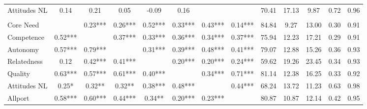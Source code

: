 \begin{tabular}[t]{lcccccccccccc}
\hspace{1em}Attitudes NL & 0.14 & 0.21 & 0.05 & -0.09 & 0.16 &  &  & 70.41 & 17.13 & 9.87 & 0.72 & 0.96\\
\addlinespace[0.3em]
\multicolumn{13}{l}{\textbf{Study 3}}\\
\hspace{1em}Core Need &  & 0.23*** & 0.26*** & 0.52*** & 0.33*** & 0.43*** & 0.14*** & 84.84 & 9.27 & 13.00 & 0.30 & 0.91\\
\hspace{1em}Competence & 0.52*** &  & 0.37*** & 0.33*** & 0.36*** & 0.34*** & 0.37*** & 75.94 & 12.23 & 17.21 & 0.29 & 0.91\\
\hspace{1em}Autonomy & 0.57*** & 0.79*** &  & 0.31*** & 0.39*** & 0.48*** & 0.41*** & 79.07 & 12.88 & 15.26 & 0.36 & 0.93\\
\hspace{1em}Relatedness & 0.12 & 0.42*** & 0.41*** &  & 0.20*** & 0.20*** & 0.24*** & 59.62 & 19.26 & 23.45 & 0.34 & 0.93\\
\hspace{1em}Quality & 0.63*** & 0.57*** & 0.61*** & 0.40*** &  & 0.34*** & 0.71*** & 81.14 & 12.38 & 16.25 & 0.33 & 0.92\\
\hspace{1em}Attitudes NL & 0.25* & 0.32** & 0.32** & 0.38*** & 0.48*** &  & 0.44*** & 68.24 & 13.72 & 11.23 & 0.63 & 0.98\\
\hspace{1em}Allport & 0.58*** & 0.60*** & 0.44*** & 0.34** & 0.20*** & 0.23*** &  & 80.87 & 10.87 & 12.14 & 0.42 & 0.95\\
\bottomrule
\end{tabular}
